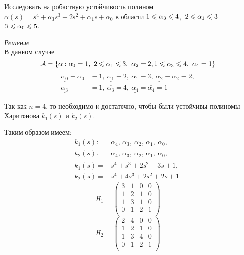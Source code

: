 \documentclass[../../TAU.tex]{subfiles}
\begin{document}
    \examp Исследовать на робастную устойчивость полином $\alpha(s) = s^4 + \alpha_3 s^3 + 2 s^2 + \alpha_1 s + \alpha_0$ в области $1\leqslant \alpha_3 \leqslant 4$,\ $ 2 \leqslant \alpha_1 \leqslant 3$ $3\leqslant \alpha_0\leqslant5$.

    {\it Решение}\\
    В данном случае 
    $$
        \mathcal{A} = \left\{\alpha: \alpha_0=1,\ 2\leqslant \alpha_1 \leqslant 3,\ \alpha_2 = 2, 1\leqslant \alpha_3\leqslant 4,\ \alpha_4=1\right\}
    $$
    \begin{align*}
        \underline{\alpha_0}=\overline{\alpha_0}&=1,\ 
        \underline{\alpha_1}=2,\ \overline{\alpha_1}=3,\
        \underline{\alpha_2}=\overline{\alpha_2}=2,\\
        \underline{\alpha_3}&=1,\ \overline{\alpha_3}=4,\ 
        \underline{\alpha_4}=\overline{\alpha_4}=1
    \end{align*}

    Так как $n=4$, то необходимо и достаточно, чтобы были устойчивы полиномы Харитонова 
    ${k}_1(s)$ и ${k}_2(s)$.

    Таким образом имеем:
    \begin{align*}
        {k}_1(s):\ &\overline{\alpha_4},\ \underline{\alpha_3},\ \underline{\alpha_2},\ \overline{\alpha_1},\ \overline{\alpha_0},\\
        {k}_2(s):\ &\overline{\alpha_4},\ \overline{\alpha_3},\ \underline{\alpha_2},\ \underline{\alpha_1},\ \overline{\alpha_0},\\
        {k}_1(s)= &s^4+s^3+2s^2+3s+1,\\
        {k}_2(s)= &s^4+4s^3+2s^2+2s+1.
    \end{align*}
    $$
        H_1=
        \begin{pmatrix}
            3 & 1 & 0 & 0 \\
            1 & 2 & 1 & 0 \\
            1 & 3 & 1 & 0 \\
            0 & 1 & 2 & 1 \\
        \end{pmatrix}
    $$
    $$
        H_2=
        \begin{pmatrix}
            2 & 4 & 0 & 0 \\
            1 & 2 & 1 & 0 \\
            1 & 3 & 4 & 0 \\
            0 & 1 & 2 & 1 \\
        \end{pmatrix}
    $$
\end{document}
